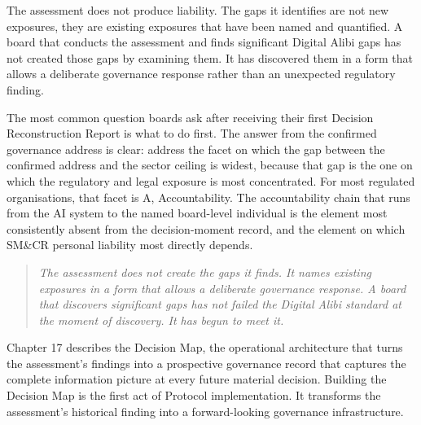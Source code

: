 The assessment does not produce liability. The gaps it identifies are not new exposures, they are existing exposures that have been named and quantified. A board that conducts the assessment and finds significant Digital Alibi gaps has not created those gaps by examining them. It has discovered them in a form that allows a deliberate governance response rather than an unexpected regulatory finding.

The most common question boards ask after receiving their first Decision Reconstruction Report is what to do first. The answer from the confirmed governance address is clear: address the facet on which the gap between the confirmed address and the sector ceiling is widest, because that gap is the one on which the regulatory and legal exposure is most concentrated. For most regulated organisations, that facet is A, Accountability. The accountability chain that runs from the AI system to the named board-level individual is the element most consistently absent from the decision-moment record, and the element on which SM\&CR personal liability most directly depends.

\begin{quote}
\emph{The assessment does not create the gaps it finds. It names existing exposures in a form that allows a deliberate governance response. A board that discovers significant gaps has not failed the Digital Alibi standard at the moment of discovery. It has begun to meet it.}
\end{quote}

Chapter 17 describes the Decision Map, the operational architecture that turns the assessment's findings into a prospective governance record that captures the complete information picture at every future material decision. Building the Decision Map is the first act of Protocol implementation. It transforms the assessment's historical finding into a forward-looking governance infrastructure.
